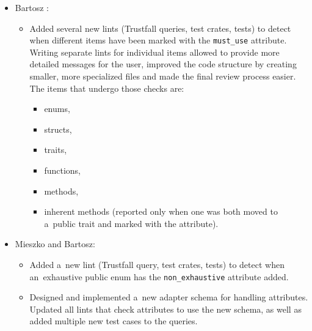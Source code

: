 \documentclass[licencjacka,en]{pracamgr}
\begin{document}
\begin{itemize}
	\item Bartosz \cite{responsibilities-bartosz}:
		\begin{itemize}



			\item Added several new lints (Trustfall queries, test crates, tests) to detect
				when different items have been marked with the \texttt{must\_use} attribute.
				Writing separate lints for individual items allowed to provide more detailed
				messages for the user, improved the code structure by creating smaller,
				more specialized files and made the final review process easier. The items that
				undergo those checks are:
				\begin{itemize}
					\item enums,
					\item structs,
					\item traits,
					\item functions,
					\item methods,
					\item inherent methods (reported only when one was both moved to a~public trait
						and marked with the attribute).
				\end{itemize}
		\end{itemize}

	\item Mieszko and Bartosz:
		\begin{itemize}
			\item Added a~new lint (Trustfall query, test crates, tests) to detect when
				an~exhaustive public enum has the \texttt{non\_exhaustive} attribute added.
			\item Designed and implemented a~new adapter schema for handling attributes.
				Updated all lints that check attributes to use the new schema, as well as added
				multiple new test cases to the queries.
		\end{itemize}
\end{itemize}
\end{document}
